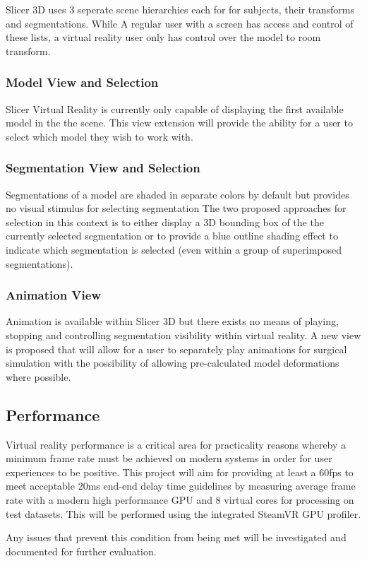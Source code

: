 Slicer 3D uses 3 seperate scene hierarchies each for for subjects, their transforms and segmentations. While A regular user with a screen has access and control of these lists, a virtual reality user only has control over the model to room transform.

\subsubsection{Model View and Selection}
Slicer Virtual Reality is currently only capable of displaying the first available model in the the scene. This view extension will provide the ability for a user to select which model they wish to work with.  

\subsubsection{Segmentation View and Selection}
Segmentations of a model are shaded in separate colors by default but provides no visual stimulus for selecting segmentation The two proposed approaches for selection in this context is to either display a 3D bounding box of the the currently selected segmentation or to provide a blue outline shading effect to indicate which segmentation is selected (even within a group of superimposed segmentations). 

\subsubsection{Animation View}
Animation is available within Slicer 3D but there exists no means of playing, stopping and controlling segmentation visibility within virtual reality. A new view is proposed that will allow for a user to separately play animations for surgical simulation with the possibility of allowing pre-calculated model deformations where possible.

\subsection{Performance}
Virtual reality performance is a critical area for practicality reasons whereby a minimum frame rate must be achieved on modern systems in order for user experiences to be positive. This project will aim for providing at least a 60fps to meet acceptable 20ms end-end delay time guidelines \cite{RaaenKjetil2015MLiV} by measuring average frame rate with a modern high performance GPU and 8 virtual cores for processing on test datasets. This will be performed using the integrated SteamVR GPU profiler.

Any issues that prevent this condition from being met will be investigated and documented for further evaluation.

